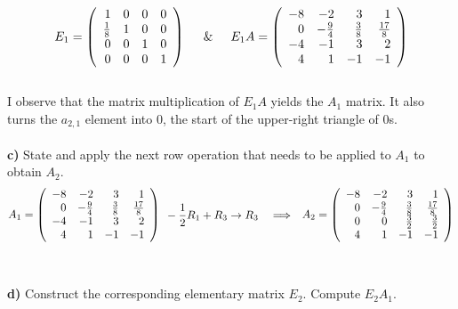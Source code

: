 \documentclass{article}
\begin{document}
\[
E_1 = 
\left(
\begin{array}{rrrr}
1 & 0 & 0 & 0 \\
\frac{1}{8} & 1 & 0 & 0 \\
0 & 0 & 1 & 0 \\
0 & 0 & 0 & 1 
\end{array}
\right)
\hspace{0.5cm} \& \hspace{0.5cm}
E_1A =
\left(
\begin{array}{rrrr}
-8 & -2 & 3 & 1 \\
0 & -\frac{9}{4} & \frac{3}{8} & \frac{17}{8} \\
-4 & -1 & 3 & 2 \\
4 & 1 & -1 & -1 
\end{array}
\right)
\]\\
I observe that the matrix multiplication of $E_1A$ yields the $A_1$ matrix. It also turns the $a_{2,1}$ element into 0, the start of the upper-right triangle of 0s.\\\\

{\bf c)} State and apply the next row operation that needs to be applied to $A_1$
to obtain $A_2$. \\

\[
A_1 =
\left(
\begin{array}{rrrr}
-8 & -2 & 3 & 1 \\
0 & -\frac{9}{4} & \frac{3}{8} & \frac{17}{8} \\
-4 & -1 & 3 & 2 \\
4 & 1 & -1 & -1 
\end{array}
\right)
\hspace{0.1cm}
\begin{aligned}
& -\frac{1}{2}R_1 + R_3 \rightarrow R_3 \quad\Longrightarrow
\end{aligned}
A_2 =
\left(
\begin{array}{rrrr}
-8 & -2 & 3 & 1 \\
0 & -\frac{9}{4} & \frac{3}{8} & \frac{17}{8} \\
0 & 0 & \frac{3}{2} & \frac{3}{2} \\
4 & 1 & -1 & -1 
\end{array}
\right)
\]\\\\

{\bf d)} Construct the corresponding elementary matrix $E_2$. Compute $E_2 A_1$. \\
\end{document}
